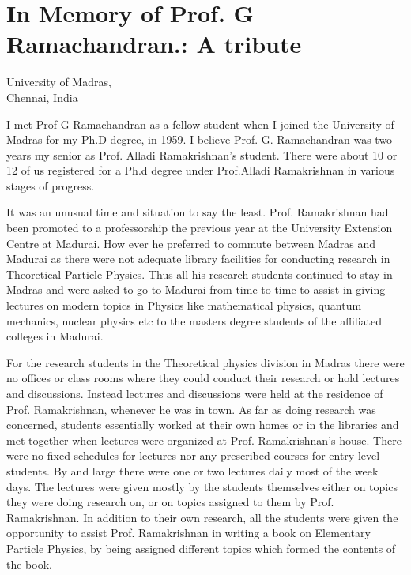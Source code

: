 \chapter[In Memory of Prof. G Ramachandran.: A tribute]{In Memory of Prof. G Ramachandran.: A tribute}\label{chap10}


\begin{center}
University of Madras,\\
Chennai, India
\end{center}

I met Prof G Ramachandran as a fellow student when I joined the University of Madras for my Ph.D degree, in 1959. I believe Prof. G. Ramachandran was two years my senior as Prof. Alladi Ramakrishnan's student.  There were about 10 or 12 of us registered for a Ph.d degree under Prof.Alladi Ramakrishnan in various stages of progress. 

It was an unusual time and situation  to say the least. Prof. Ramakrishnan had been promoted to a professorship the previous year at the University Extension Centre at Madurai. How ever he preferred to commute between Madras and Madurai as there were not adequate library facilities for conducting research in Theoretical Particle Physics. Thus all his research students continued to stay in Madras and were asked to go to Madurai from time to time to assist in giving lectures on modern topics in Physics like mathematical physics, quantum mechanics, nuclear physics etc to the masters degree students of the affiliated colleges in Madurai.

For the research students in the Theoretical physics division in Madras there were no offices or class rooms where they could conduct their research or hold lectures and discussions. Instead lectures and discussions were held at the residence of Prof. Ramakrishnan, whenever he was in town. As far as doing research was concerned, students essentially worked at their own homes or in the libraries and met together when lectures were organized at Prof. Ramakrishnan's house. There were no fixed schedules for lectures nor any prescribed courses for entry level students. By and large there were one or two lectures daily  most of the week days. The lectures were  given mostly by the students themselves either on topics they were doing research on, or on topics assigned to them by Prof. Ramakrishnan. In addition to their own research, all the students were given the opportunity to assist Prof. Ramakrishnan in writing a book on Elementary Particle Physics, by being assigned different topics which formed the contents of the book.

